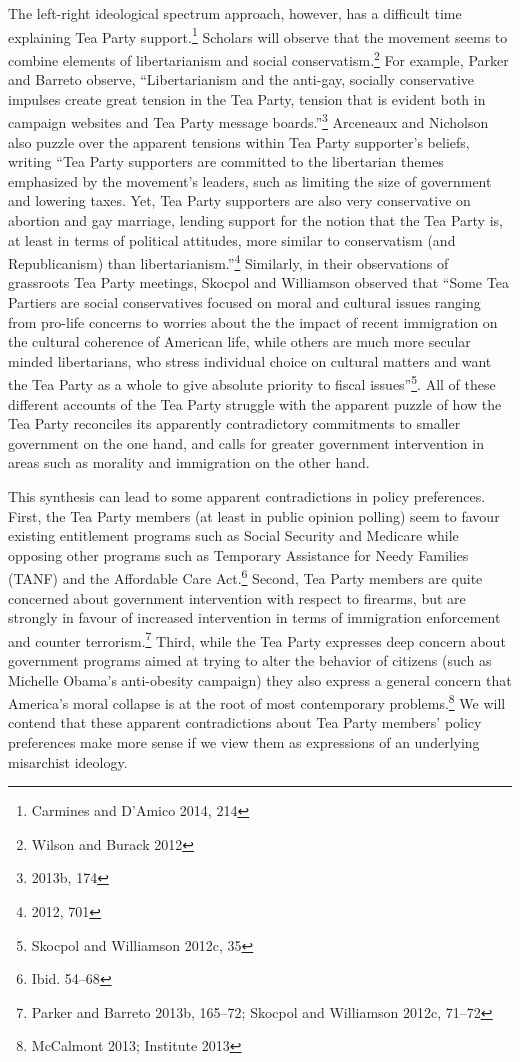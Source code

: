 \documentclass[12pt,]{article}
\begin{document}
The left-right ideological spectrum approach, however, has a difficult
time explaining Tea Party support.\footnote{Carmines and D'Amico 2014,
  214} Scholars will observe that the movement seems to combine elements
of libertarianism and social conservatism.\footnote{Wilson and Burack
  2012} For example, Parker and Barreto observe, ``Libertarianism and
the anti-gay, socially conservative impulses create great tension in the
Tea Party, tension that is evident both in campaign websites and Tea
Party message boards.''\footnote{2013b, 174} Arceneaux and Nicholson
also puzzle over the apparent tensions within Tea Party supporter's
beliefs, writing ``Tea Party supporters are committed to the libertarian
themes emphasized by the movement's leaders, such as limiting the size
of government and lowering taxes. Yet, Tea Party supporters are also
very conservative on abortion and gay marriage, lending support for the
notion that the Tea Party is, at least in terms of political attitudes,
more similar to conservatism (and Republicanism) than
libertarianism.''\footnote{2012, 701} Similarly, in their observations
of grassroots Tea Party meetings, Skocpol and Williamson observed that
``Some Tea Partiers are social conservatives focused on moral and
cultural issues ranging from pro-life concerns to worries about the the
impact of recent immigration on the cultural coherence of American life,
while others are much more secular minded libertarians, who stress
individual choice on cultural matters and want the Tea Party as a whole
to give absolute priority to fiscal issues''\footnote{Skocpol and
  Williamson 2012c, 35}. All of these different accounts of the Tea
Party struggle with the apparent puzzle of how the Tea Party reconciles
its apparently contradictory commitments to smaller government on the
one hand, and calls for greater government intervention in areas such as
morality and immigration on the other hand.

This synthesis can lead to some apparent contradictions in policy
preferences. First, the Tea Party members (at least in public opinion
polling) seem to favour existing entitlement programs such as Social
Security and Medicare while opposing other programs such as Temporary
Assistance for Needy Families (TANF) and the Affordable Care
Act.\footnote{Ibid. 54--68} Second, Tea Party members are quite
concerned about government intervention with respect to firearms, but
are strongly in favour of increased intervention in terms of immigration
enforcement and counter terrorism.\footnote{Parker and Barreto 2013b,
  165--72; Skocpol and Williamson 2012c, 71--72} Third, while the Tea
Party expresses deep concern about government programs aimed at trying
to alter the behavior of citizens (such as Michelle Obama's anti-obesity
campaign) they also express a general concern that America's moral
collapse is at the root of most contemporary problems.\footnote{McCalmont
  2013; Institute 2013} We will contend that these apparent
contradictions about Tea Party members' policy preferences make more
sense if we view them as expressions of an underlying misarchist
ideology.
\end{document}

